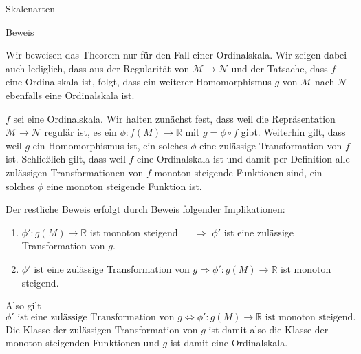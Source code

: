 \documentclass[
  8pt,
  ignorenonframetext,
]{beamer}
\providecommand{\tightlist}{%
  \setlength{\itemsep}{0pt}\setlength{\parskip}{0pt}}
\begin{document}
\begin{frame}{Skalenarten}
\protect\hypertarget{skalenarten-4}{}
\footnotesize

\underline{Beweis}

Wir beweisen das Theorem nur für den Fall einer Ordinalskala. Wir zeigen
dabei auch lediglich, dass aus der Regularität von
\(\mathcal{M} \to \mathcal{N}\) und der Tatsache, dass \(f\) eine
Ordinalskala ist, folgt, dass ein weiterer Homomorphismus \(g\) von
\(\mathcal{M}\) nach \(\mathcal{N}\) ebenfalls eine Ordinalskala ist.

\(f\) sei eine Ordinalskala. Wir halten zunächst fest, dass weil die
Repräsentation \(\mathcal{M} \to \mathcal{N}\) regulär ist, es ein
\(\phi : f(M) \to \mathbb{R}\) mit \(g = \phi \circ f\) gibt. Weiterhin
gilt, dass weil \(g\) ein Homomorphismus ist, ein solches \(\phi\) eine
zulässige Transformation von \(f\) ist. Schließlich gilt, dass weil
\(f\) eine Ordinalskala ist und damit per Definition alle zulässigen
Transformationen von \(f\) monoton steigende Funktionen sind, ein
solches \(\phi\) eine monoton steigende Funktion ist.

Der restliche Beweis erfolgt durch Beweis folgender Implikationen:

\begin{enumerate}
[(1)]
\tightlist
\item
  \(\phi' : g(M) \to \mathbb{R}\) ist monoton steigend
  \(\quad\,\,\Rightarrow\) \(\phi'\) ist eine zulässige Transformation
  von \(g\).
\item
  \(\phi'\) ist eine zulässige Transformation von
  \(g \Rightarrow \phi' : g(M) \to \mathbb{R}\) ist monoton steigend.
\end{enumerate}

Also gilt \begin{equation}
\phi' \mbox{ ist eine zulässige Transformation von } g \Leftrightarrow \phi' : g(M) \to \mathbb{R} \mbox{ ist monoton steigend}.
\end{equation} Die Klasse der zulässigen Transformation von \(g\) ist
damit also die Klasse der monoton steigenden Funktionen und \(g\) ist
damit eine Ordinalskala.
\end{frame}
\end{document}
